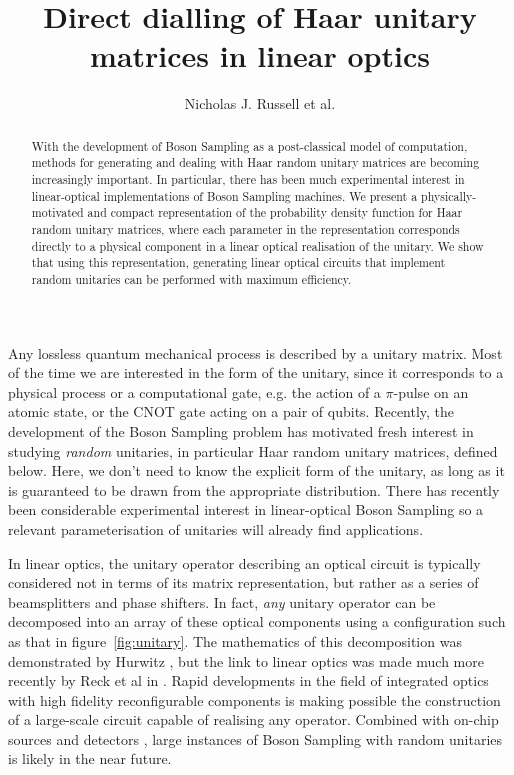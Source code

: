 \documentclass[aps,prl,twocolumn]{revtex4}
\begin{document}
\title{Direct dialling of Haar unitary matrices in linear optics}

\author{Nicholas J. Russell et al.}

\begin{abstract}
With the development of Boson Sampling as a post-classical model of computation,
methods for generating and dealing with Haar random unitary matrices are
becoming increasingly important. In particular, there has been much experimental
interest in linear-optical implementations of Boson Sampling machines. We
present a physically-motivated and compact representation of the probability
density function for Haar random unitary matrices, where each parameter in the
representation corresponds directly to a physical component in a linear optical
realisation of the unitary. We show that using this representation, generating
linear optical circuits that implement random unitaries can be performed with
maximum efficiency.
\end{abstract}

\maketitle

Any lossless quantum mechanical process is described by a unitary matrix. Most
of the time we are interested in the form of the unitary, since it corresponds
to a physical process or a computational gate, e.g. the action of a
\(\pi\)-pulse on an atomic state, or the CNOT gate acting on a pair of qubits.
Recently, the development of the Boson Sampling problem \cite{aa-conf-11-333}
has motivated fresh interest in studying \emph{random} unitaries, in particular
Haar random unitary matrices, defined below. Here, we don't need to know the
explicit form of
the unitary, as long as it is guaranteed to be drawn from the appropriate
distribution. There has recently been considerable experimental interest in
linear-optical Boson Sampling \cite{cr-nat-7-545, br-sci-339-794,
sp-sci-339-798, ti-nphoton-7-540} so a relevant parameterisation of unitaries
will already find applications.

In linear optics, the unitary operator describing an optical circuit is
typically considered not in terms of its matrix representation, but rather as a
series of beamsplitters and phase shifters. In fact, \emph{any} unitary
operator can be decomposed into an array of these optical components using a
configuration such as that in figure~\ref{fig:unitary}. The mathematics of this
decomposition was demonstrated by Hurwitz \cite{hurwitz}, but the link to linear
optics was made much more recently by Reck et al in \cite{re-prl-73-58}. Rapid 
developments in the field of integrated optics with high fidelity
reconfigurable components \cite{re-nphoton-4-518}
is making possible the construction of a large-scale circuit capable
of realising any operator. Combined with on-chip sources \cite{si-nphoton-8-104}
and detectors \cite{re-srep-3, pe-ncomm-3-1325}, large instances of Boson
Sampling with random unitaries is likely in the near future.
\end{document}

